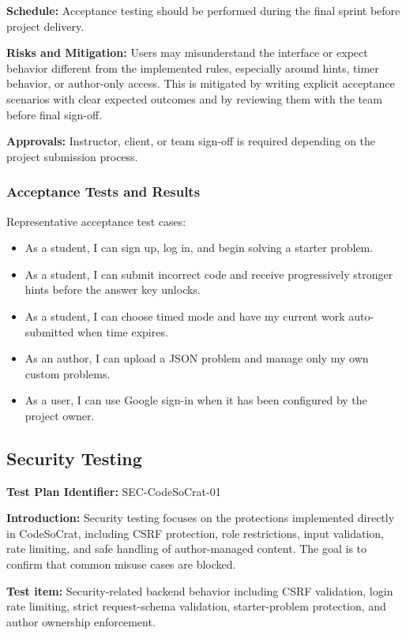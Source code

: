 \textbf{Schedule:}
Acceptance testing should be performed during the final sprint before project delivery.

\textbf{Risks and Mitigation:}
Users may misunderstand the interface or expect behavior different from the implemented rules, especially around hints, timer behavior, or author-only access. This is mitigated by writing explicit acceptance scenarios with clear expected outcomes and by reviewing them with the team before final sign-off.

\textbf{Approvals:}
Instructor, client, or team sign-off is required depending on the project submission process.

\subsubsection{Acceptance Tests and Results}
Representative acceptance test cases:
\begin{itemize}
    \item As a student, I can sign up, log in, and begin solving a starter problem.
    \item As a student, I can submit incorrect code and receive progressively stronger hints before the answer key unlocks.
    \item As a student, I can choose timed mode and have my current work auto-submitted when time expires.
    \item As an author, I can upload a JSON problem and manage only my own custom problems.
    \item As a user, I can use Google sign-in when it has been configured by the project owner.
\end{itemize}

\subsection{Security Testing}
\textbf{Test Plan Identifier:}
SEC-CodeSoCrat-01

\textbf{Introduction:}
Security testing focuses on the protections implemented directly in CodeSoCrat, including CSRF protection, role restrictions, input validation, rate limiting, and safe handling of author-managed content. The goal is to confirm that common misuse cases are blocked.

\textbf{Test item:}
Security-related backend behavior including CSRF validation, login rate limiting, strict request-schema validation, starter-problem protection, and author ownership enforcement.

